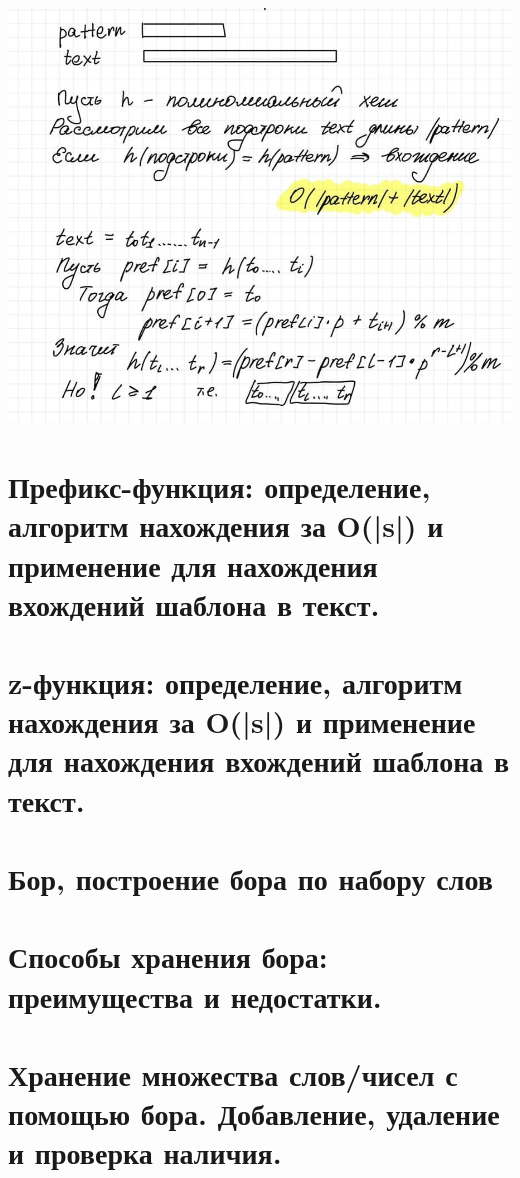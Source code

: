 \includegraphics[width=1\linewidth]{images/Rabin-Carp.jpg}
\newpage{}

\section{Префикс-функция: определение, алгоритм нахождения за O(|s|) и применение для нахождения вхождений шаблона в текст.}

\newpage{}

\section{z-функция: определение, алгоритм нахождения за O(|s|) и применение для нахождения вхождений шаблона в текст.}

\newpage{}

\section{Бор, построение бора по набору слов}
\section{Способы хранения бора: преимущества и недостатки.}
\section{Хранение множества слов/чисел с помощью бора. Добавление, удаление и проверка наличия.}


